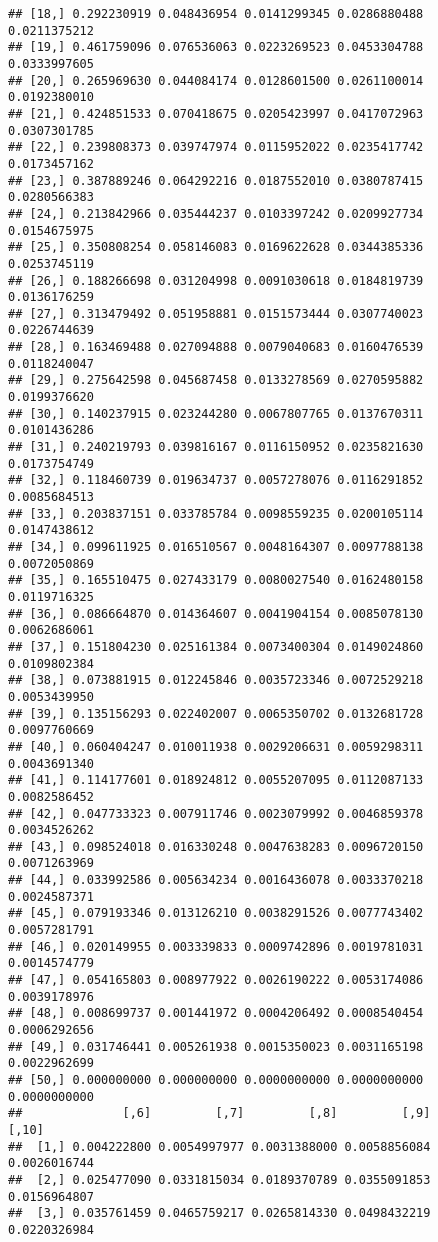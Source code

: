 \documentclass[]{article}
\begin{document}
\begin{verbatim}
## [18,] 0.292230919 0.048436954 0.0141299345 0.0286880488 0.0211375212
## [19,] 0.461759096 0.076536063 0.0223269523 0.0453304788 0.0333997605
## [20,] 0.265969630 0.044084174 0.0128601500 0.0261100014 0.0192380010
## [21,] 0.424851533 0.070418675 0.0205423997 0.0417072963 0.0307301785
## [22,] 0.239808373 0.039747974 0.0115952022 0.0235417742 0.0173457162
## [23,] 0.387889246 0.064292216 0.0187552010 0.0380787415 0.0280566383
## [24,] 0.213842966 0.035444237 0.0103397242 0.0209927734 0.0154675975
## [25,] 0.350808254 0.058146083 0.0169622628 0.0344385336 0.0253745119
## [26,] 0.188266698 0.031204998 0.0091030618 0.0184819739 0.0136176259
## [27,] 0.313479492 0.051958881 0.0151573444 0.0307740023 0.0226744639
## [28,] 0.163469488 0.027094888 0.0079040683 0.0160476539 0.0118240047
## [29,] 0.275642598 0.045687458 0.0133278569 0.0270595882 0.0199376620
## [30,] 0.140237915 0.023244280 0.0067807765 0.0137670311 0.0101436286
## [31,] 0.240219793 0.039816167 0.0116150952 0.0235821630 0.0173754749
## [32,] 0.118460739 0.019634737 0.0057278076 0.0116291852 0.0085684513
## [33,] 0.203837151 0.033785784 0.0098559235 0.0200105114 0.0147438612
## [34,] 0.099611925 0.016510567 0.0048164307 0.0097788138 0.0072050869
## [35,] 0.165510475 0.027433179 0.0080027540 0.0162480158 0.0119716325
## [36,] 0.086664870 0.014364607 0.0041904154 0.0085078130 0.0062686061
## [37,] 0.151804230 0.025161384 0.0073400304 0.0149024860 0.0109802384
## [38,] 0.073881915 0.012245846 0.0035723346 0.0072529218 0.0053439950
## [39,] 0.135156293 0.022402007 0.0065350702 0.0132681728 0.0097760669
## [40,] 0.060404247 0.010011938 0.0029206631 0.0059298311 0.0043691340
## [41,] 0.114177601 0.018924812 0.0055207095 0.0112087133 0.0082586452
## [42,] 0.047733323 0.007911746 0.0023079992 0.0046859378 0.0034526262
## [43,] 0.098524018 0.016330248 0.0047638283 0.0096720150 0.0071263969
## [44,] 0.033992586 0.005634234 0.0016436078 0.0033370218 0.0024587371
## [45,] 0.079193346 0.013126210 0.0038291526 0.0077743402 0.0057281791
## [46,] 0.020149955 0.003339833 0.0009742896 0.0019781031 0.0014574779
## [47,] 0.054165803 0.008977922 0.0026190222 0.0053174086 0.0039178976
## [48,] 0.008699737 0.001441972 0.0004206492 0.0008540454 0.0006292656
## [49,] 0.031746441 0.005261938 0.0015350023 0.0031165198 0.0022962699
## [50,] 0.000000000 0.000000000 0.0000000000 0.0000000000 0.0000000000
##              [,6]         [,7]         [,8]         [,9]        [,10]
##  [1,] 0.004222800 0.0054997977 0.0031388000 0.0058856084 0.0026016744
##  [2,] 0.025477090 0.0331815034 0.0189370789 0.0355091853 0.0156964807
##  [3,] 0.035761459 0.0465759217 0.0265814330 0.0498432219 0.0220326984

\end{verbatim}
\end{document}

